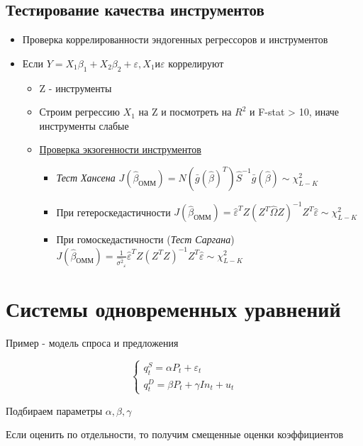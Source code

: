 \documentclass[a4paper, 12pt]{article}
\begin{document}
\subsection{Тестирование качества инструментов}
\begin{itemize}
    \item Проверка коррелированности эндогенных регрессоров и инструментов
    \item Если $Y = X_{1}\beta_{1} + X_{2}\beta_{2} + \varepsilon, X_{1} \textrm{и} \varepsilon$ коррелируют
    \begin{itemize}
        \item Z - инструменты
        \item Строим регрессию $X_{1}$ на Z и посмотреть на $R^{2}$ и F-stat > 10, иначе инструменты слабые
        \item \underline{Проверка экзогенности инструментов}
        \begin{itemize}
            \item \textit{Тест Хансена}
            $J(\hat{\beta}_{\textrm{ОММ}}) = N(\bar{g}(\hat{\beta})^{T})\hat{S}^{-1}\bar{g}(\hat{\beta}) \sim \chi^{2}_{L - K}$
            \item При гетероскедастичности
            $J(\hat{\beta}_{\textrm{ОММ}}) = \hat{\varepsilon}^{T}Z(Z^{T}\hat{\Omega}Z)^{-1}Z^{T}\hat{\varepsilon} \sim \chi^{2}_{L - K}$
            \item При гомоскедастичности (\textit{Тест Саргана})
            $J(\hat{\beta}_{\textrm{ОММ}}) = \frac{1}{\hat{\sigma^{2}}_{\varepsilon}}\hat{\varepsilon}^{T}Z(Z^{T}Z)^{-1}Z^{T}\hat{\varepsilon} \sim \chi^{2}_{L - K}$
        \end{itemize}
    \end{itemize}
\end{itemize}

\section{Системы одновременных уравнений}

Пример - модель спроса и предложения

\[\begin{cases}
    q_{t}^{S} = \alpha P_{t} + \varepsilon_{t} \\
    q_{t}^{D} = \beta P_{t} + \gamma In_{t} + u_{t}
\end{cases}\]

Подбираем параметры $\alpha, \beta, \gamma$

Если оценить по отдельности, то получим смещенные оценки коэффициентов
\end{document}

